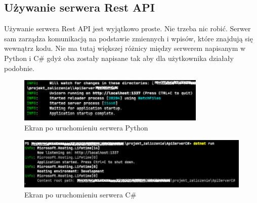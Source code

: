 \subsection{Używanie serwera Rest API}
\begin{spacing}{1.5} %
    Używanie serwera Rest API jest wyjątkowo proste. Nie trzeba nic robić. Serwer sam zarządza komunikacją na podstawie zmiennych i wpisów, które znajdują się wewnątrz kodu. Nie ma tutaj większej różnicy między serwerem napisanym w Python i C\# gdyż oba zostały napisane tak aby dla użytkownika działały podobnie.
    \begin{figure}[ht]
        \centering
        \noindent\hspace*{-1.8cm} %
        \includegraphics[width=0.8\textwidth]{assets/python_server_start.png}
        \caption{Ekran po uruchomieniu serwera Python}
        \label{fig:python_server_start}
    \end{figure}

    \begin{figure}[ht]
        \centering
        \noindent\hspace*{-1.8cm} %
        \includegraphics[width=1.0\textwidth]{assets/csharp_server_start.png}
        \caption{Ekran po uruchomieniu serwera C\#}
        \label{fig:csharp_server_start}
    \end{figure}
\end{spacing} %

